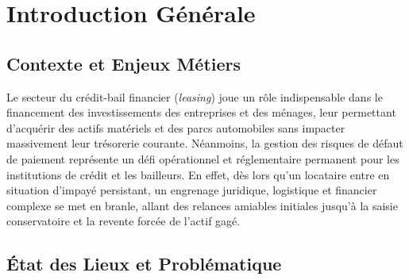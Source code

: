
\chapter*{Introduction Générale}

\section*{Contexte et Enjeux Métiers}

Le secteur du crédit-bail financier (\textit{leasing}) joue un rôle indispensable dans le financement des investissements des entreprises et des ménages, leur permettant d'acquérir des actifs matériels et des parcs automobiles sans impacter massivement leur trésorerie courante. Néanmoins, la gestion des risques de défaut de paiement représente un défi opérationnel et réglementaire permanent pour les institutions de crédit et les bailleurs. En effet, dès lors qu'un locataire entre en situation d'impayé persistant, un engrenage juridique, logistique et financier complexe se met en branle, allant des relances amiables initiales jusqu'à la saisie conservatoire et la revente forcée de l'actif gagé.

\section*{État des Lieux et Problématique}

